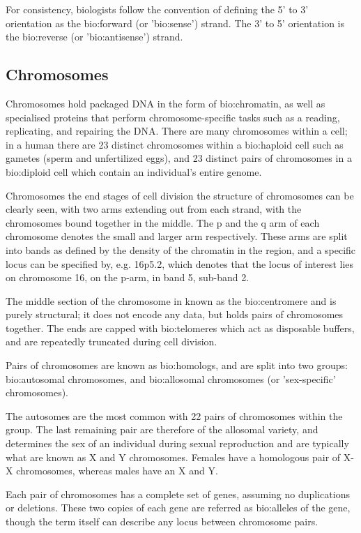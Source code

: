 For consistency, biologists follow the convention of defining the 5' to 3' orientation as the \gls{bio:forward} (or '\gls{bio:sense}') strand. The 3' to 5' orientation is the \gls{bio:reverse} (or '\gls{bio:antisense}') strand.

\subsection{Chromosomes}

Chromosomes hold packaged DNA in the form of \gls{bio:chromatin}, as well as specialised proteins that perform chromosome-specific tasks such as a reading, replicating, and repairing the DNA. There are many chromosomes within a cell; in a human there are 23 distinct chromosomes within a \gls{bio:haploid} cell such as gametes (sperm and unfertilized eggs), and 23 distinct pairs of chromosomes in a \gls{bio:diploid} cell which contain  an individual's entire genome.

Chromosomes the end stages of cell division the structure of chromosomes can be clearly seen, with two arms extending out from each strand, with the chromosomes bound together in the middle. The p and the q arm of each chromosome denotes the small and larger arm respectively. These arms are split into bands as defined by the density of the chromatin in the region, and a specific locus can be specified by, e.g. 16p5.2, which denotes that the locus of interest lies on chromosome 16, on the p-arm, in band 5, sub-band 2.

The middle section of the chromosome in known as the \gls{bio:centromere} and is purely structural; it does not encode any data, but holds pairs of chromosomes together. The ends are capped with \gls{bio:telomeres} which act as disposable buffers, and are repeatedly truncated during cell division.

Pairs of chromosomes are known as \gls{bio:homologs}, and are split into two groups: \gls{bio:autosomal} chromosomes, and \gls{bio:allosomal} chromosomes (or 'sex-specific' chromosomes).

The autosomes are the most common with 22 pairs of chromosomes within the group. The last remaining pair are therefore of the allosomal variety, and determines the sex of an individual during sexual reproduction and are typically what are known as X and Y chromosomes. Females have a homologous pair of X-X chromosomes, whereas males have an X and Y.

Each pair of chromosomes has a complete set of genes, assuming no duplications or deletions. These two copies of each gene are referred as \gls{bio:alleles} of the gene, though the term itself can describe any locus between chromosome pairs.


